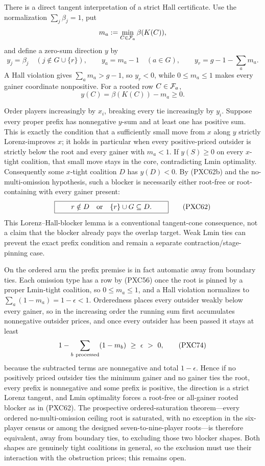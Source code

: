 \documentclass[11pt]{article}
\begin{document}
There is a direct tangent interpretation of a strict Hall certificate.  Use
the normalization $\sum_j\beta_j=1$, put
\[
 m_a:=\min_{C\in{\cal F}_a}\beta(K(C)),
\]
and define a zero-sum direction $y$ by
\[
 y_j=\beta_j\quad(j\notin G\cup\{r\}),\qquad
 y_a=m_a-1\quad(a\in G),\qquad
 y_r=g-1-\sum_a m_a.                                \tag{PXC62a}
\]
A Hall violation gives $\sum_a m_a>g-1$, so $y_r<0$, while
$0\le m_a\le1$ makes every gainer coordinate nonpositive.  For a rooted row
$C\in{\cal F}_a$,
\[
 y(C)=\beta(K(C))-m_a\ge0.                          \tag{PXC62b}
\]

Order players increasingly by $x_i$, breaking every tie increasingly by
$y_i$.  Suppose every proper prefix has nonnegative $y$-sum and at least one
has positive sum.  This is exactly the condition that a sufficiently small
move from $x$ along $y$ strictly Lorenz-improves $x$; it holds in particular
when every positive-priced outsider is strictly below the root and every
gainer with $m_a<1$.  If $y(S)\ge0$ on every $x$-tight coalition, that small
move stays in the core, contradicting Lmin optimality.
Consequently some $x$-tight coalition $D$ has $y(D)<0$.  By (PXC62b) and the
no-multi-omission hypothesis, such a blocker is necessarily either root-free
or root-containing with every gainer present:
\[
 \boxed{\qquad
 r\notin D\quad\hbox{or}\quad \{r\}\cup G\subseteq D.
 \qquad}                                             \tag{PXC62}
\]
This Lorenz--Hall-blocker lemma is a conventional tangent-cone consequence,
not a claim that the blocker already pays the overlap target.  Weak Lmin ties
can prevent the exact prefix condition and remain a separate
contraction/stage-pinning case.

On the ordered arm the prefix premise is in fact automatic away from
boundary ties.  Each omission type has a row by (PXC56) once the root is
pinned by a proper Lmin-tight coalition, so $0\le m_a\le1$, and a
Hall violation normalizes to $\sum_a(1-m_a)=1-\epsilon<1$.  Orderedness
places every outsider weakly below every gainer, so in the increasing
order the running sum first accumulates nonnegative outsider prices, and
once every outsider has been passed it stays at least
\[
 1-\sum_{b\ {\rm processed}}(1-m_b)\ \ge\ \epsilon\ >\ 0,
                                                       \tag{PXC74}
\]
because the subtracted terms are nonnegative and total $1-\epsilon$.
Hence if no positively priced outsider ties the minimum gainer and no
gainer ties the root, every prefix is nonnegative and some prefix is
positive, the direction is a strict Lorenz tangent, and Lmin optimality
forces a root-free or all-gainer rooted blocker as in (PXC62).  The
prospective ordered-saturation theorem---every ordered no-multi-omission
ceiling root is saturated, with no exception in the six-player census or
among the designed seven-to-nine-player roots---is therefore equivalent,
away from boundary ties, to excluding those two blocker shapes.  Both
shapes are genuinely tight coalitions in general, so the exclusion must
use their interaction with the obstruction prices; this remains open.
\end{document}
